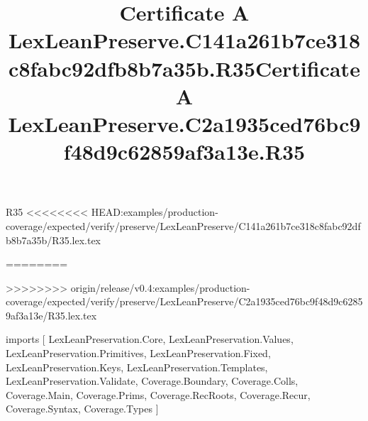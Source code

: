 \begin{lexlean}{R35}
<<<<<<<< HEAD:examples/production-coverage/expected/verify/preserve/LexLeanPreserve/C141a261b7ce318c8fabc92dfb8b7a35b/R35.lex.tex
\title{Certificate A LexLeanPreserve.C141a261b7ce318c8fabc92dfb8b7a35b.R35}
========
\title{Certificate A LexLeanPreserve.C2a1935ced76bc9f48d9c62859af3a13e.R35}
>>>>>>>> origin/release/v0.4:examples/production-coverage/expected/verify/preserve/LexLeanPreserve/C2a1935ced76bc9f48d9c62859af3a13e/R35.lex.tex
\begin{coremodule}
imports [
  LexLeanPreservation.Core,
  LexLeanPreservation.Values,
  LexLeanPreservation.Primitives,
  LexLeanPreservation.Fixed,
  LexLeanPreservation.Keys,
  LexLeanPreservation.Templates,
  LexLeanPreservation.Validate,
  Coverage.Boundary,
  Coverage.Colls,
  Coverage.Main,
  Coverage.Prims,
  Coverage.RecRoots,
  Coverage.Recur,
  Coverage.Syntax,
  Coverage.Types
]


\end{coremodule}
\end{lexlean}
